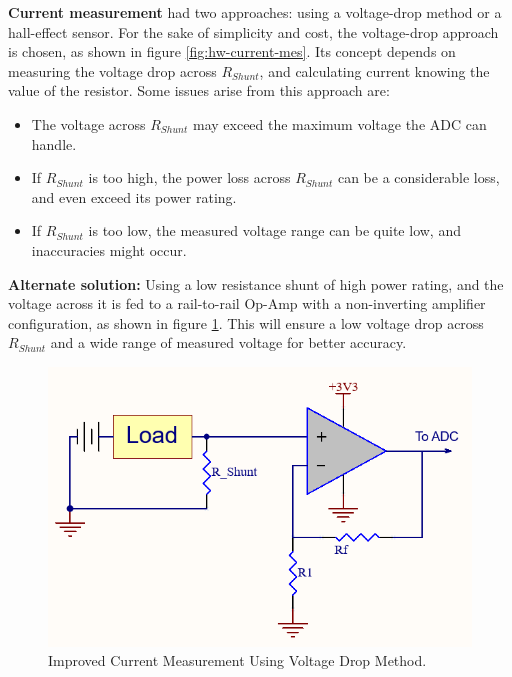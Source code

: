 \textbf{Current measurement} had two approaches: using a voltage-drop method or a hall-effect sensor. For the sake of simplicity and cost, the voltage-drop approach is chosen, as shown in figure \ref{fig:hw-current-mes}. Its concept depends on measuring the voltage drop across \textbf{$R_{Shunt}$}, and calculating current knowing the value of the resistor. Some issues arise from this approach are:
\begin{itemize}
    \item The voltage across \textbf{$R_{Shunt}$} may exceed the maximum voltage the ADC can handle.
    \item If \textbf{$R_{Shunt}$} is too high, the power loss across \textbf{$R_{Shunt}$} can be a considerable loss, and even exceed its power rating.
    \item If \textbf{$R_{Shunt}$} is too low, the measured voltage range can be quite low, and inaccuracies might occur.
\end{itemize}

\textbf{Alternate solution:} Using a low resistance shunt of high power rating, and the voltage across it is fed to a rail-to-rail Op-Amp with a non-inverting amplifier configuration, as shown in figure \ref{fig:hw-current-mes-2}. This will ensure a low voltage drop across \textbf{$R_{Shunt}$} and a wide range of measured voltage for better accuracy. 

\begin{figure}[h!]
    \centering
    \includegraphics[scale=0.5]{./Figures/HW/Improved-Current-Measurement.png}
    \caption{Improved Current Measurement Using Voltage Drop Method.}
    \label{fig:hw-current-mes-2}
\end{figure}


